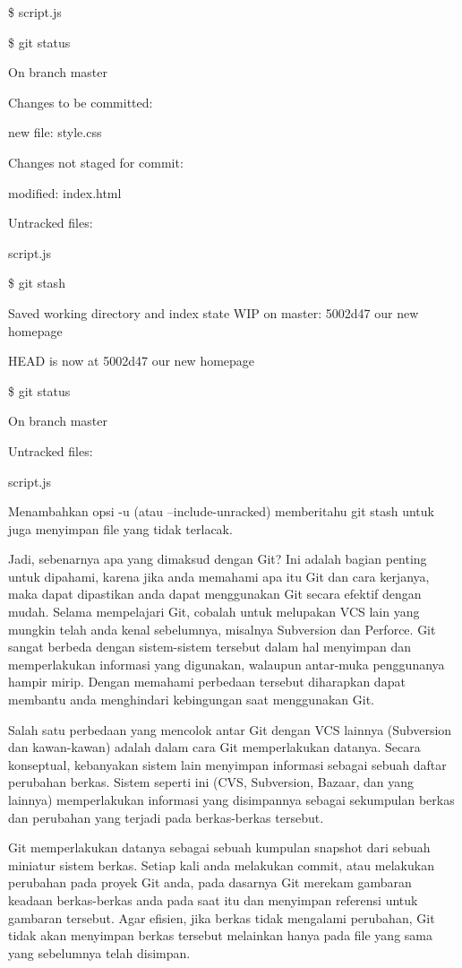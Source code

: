 \documentclass[12pt,a4paper]{article}
\begin{document}
\$ script.js

\$ git status

On branch master

Changes to be committed:

new file: style.css

Changes not staged for commit:

modified: index.html

Untracked files:

script.js

\$ git stash

Saved working directory and index state WIP on master: 5002d47 our new 
homepage

HEAD is now at 5002d47 our new homepage

\$ git status

On branch master

Untracked files:

script.js

Menambahkan opsi -u (atau --include-unracked) memberitahu git stash 
untuk juga menyimpan file yang tidak terlacak.\vspace{12pt}



Jadi, sebenarnya apa yang dimaksud dengan Git? Ini adalah bagian penting 
untuk dipahami, karena jika anda memahami apa itu Git dan cara kerjanya, 
maka dapat dipastikan anda dapat menggunakan Git secara efektif dengan 
mudah. Selama mempelajari Git, cobalah untuk melupakan VCS lain yang 
mungkin telah anda kenal sebelumnya, misalnya Subversion dan Perforce. 
Git sangat berbeda dengan sistem-sistem tersebut dalam hal menyimpan dan 
memperlakukan informasi yang digunakan, walaupun antar-muka penggunanya 
hampir mirip. Dengan memahami perbedaan tersebut diharapkan dapat 
membantu anda menghindari kebingungan saat menggunakan Git.\vspace{12pt}

Salah satu perbedaan yang mencolok antar Git dengan VCS lainnya 
(Subversion dan kawan-kawan) adalah dalam cara Git memperlakukan 
datanya. Secara konseptual, kebanyakan sistem lain menyimpan informasi 
sebagai sebuah daftar perubahan berkas. Sistem seperti ini (CVS, 
Subversion, Bazaar, dan yang lainnya) memperlakukan informasi yang 
disimpannya sebagai sekumpulan berkas dan perubahan yang terjadi pada 
berkas-berkas tersebut.\vspace{12pt}

Git memperlakukan datanya sebagai sebuah kumpulan snapshot dari sebuah 
miniatur sistem berkas. Setiap kali anda melakukan commit, atau 
melakukan perubahan pada proyek Git anda, pada dasarnya Git merekam 
gambaran keadaan berkas-berkas anda pada saat itu dan menyimpan 
referensi untuk gambaran tersebut. Agar efisien, jika berkas tidak 
mengalami perubahan, Git tidak akan menyimpan berkas tersebut melainkan 
hanya pada file yang sama yang sebelumnya telah disimpan.\vspace{12pt}
\end{document}
